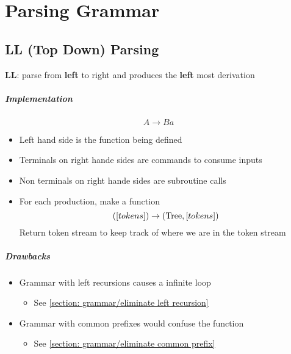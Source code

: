 \chapter{Parsing Grammar}

\section{LL (Top Down) Parsing}

  \begin{definition}
    \textbf{LL}: parse from \textbf{left} to right and produces the
    \textbf{left} most derivation
  \end{definition}

  \paragraph{Implementation}
  \begin{equation*}
    A \to B a
  \end{equation*}
  \begin{itemize}
    \item Left hand side is the function being defined
    \item Terminals on right hande sides are commands to consume inputs
    \item Non terminals on right hande sides are subroutine calls
    \item For each production, make a function
    \begin{equation*}
      \left( \left[ tokens \right] \right) \to
      \left( \operatorname{Tree}, \left[ tokens \right] \right)
    \end{equation*}
    Return token stream to keep track of where we are in the token stream
  \end{itemize}

  \paragraph{Drawbacks}
  \begin{itemize}
    \item Grammar with left recursions causes a infinite loop
    \begin{itemize}
      \item See \ref{section: grammar/eliminate left recursion}
    \end{itemize}
    \item Grammar with common prefixes would confuse the function
    \begin{itemize}
      \item See \ref{section: grammar/eliminate common prefix}
    \end{itemize}
  \end{itemize}

